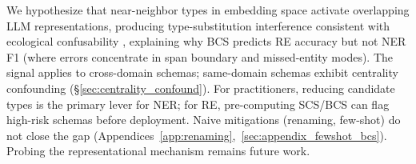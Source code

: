 We hypothesize that near-neighbor types in embedding space activate overlapping LLM representations, producing type-substitution interference consistent with ecological confusability \citep{baan-2023-ecological}, explaining why BCS predicts RE accuracy but not NER F1 (where errors concentrate in span boundary and missed-entity modes). The signal applies to cross-domain schemas; same-domain schemas exhibit centrality confounding (\S\ref{sec:centrality_confound}). For practitioners, reducing candidate types is the primary lever for NER; for RE, pre-computing SCS/BCS can flag high-risk schemas before deployment. Naive mitigations (renaming, few-shot) do not close the gap (Appendices~\ref{app:renaming},~\ref{sec:appendix_fewshot_bcs}). Probing the representational mechanism remains future work.
